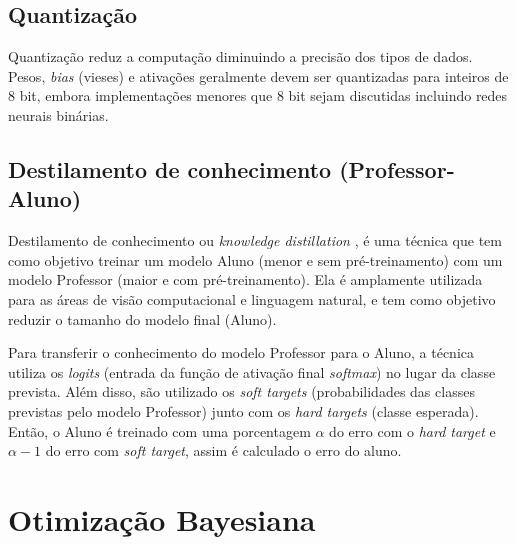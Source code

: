 \subsection{Quantização}\label{quantizacao}


Quantização reduz a computação diminuindo a precisão dos tipos de dados. Pesos, \textit{bias} (vieses) e ativações
geralmente devem ser quantizadas para inteiros de 8 bit, embora implementações menores que 8 bit sejam discutidas
incluindo redes neurais binárias. \cite{LIANG2021370}


\subsection{Destilamento de conhecimento (Professor-Aluno)}\label{conceitos_destilamento}

Destilamento de conhecimento ou \textit{knowledge distillation} \cite{hinton2015distilling}, é uma técnica que tem
como objetivo treinar um modelo Aluno (menor e sem pré-treinamento) com um modelo Professor
(maior e com pré-treinamento). Ela é amplamente utilizada para as áreas de visão computacional e linguagem natural,
e tem como objetivo reduzir o tamanho do modelo final (Aluno).

Para transferir o conhecimento do modelo Professor para o Aluno, a técnica utiliza os \textit{logits} (entrada da
função de ativação final \textit{softmax}) no lugar da classe prevista. Além disso, são utilizado os
\textit{soft targets} (probabilidades das classes previstas pelo modelo Professor) junto com os
\textit{hard targets} (classe esperada). Então, o Aluno é treinado com uma porcentagem $\alpha$ do erro com o
\textit{hard target} e $\alpha - 1$ do erro com \textit{soft target}, assim é calculado o erro do aluno.



\section{Otimização Bayesiana}
